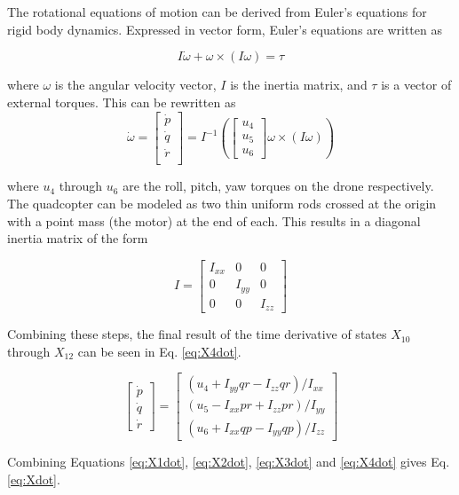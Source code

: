 \documentclass[letterpaper, preprint, paper,11pt]{AAS}	%
\begin{document}
The rotational equations of motion can be derived from Euler’s equations for rigid body dynamics. Expressed in vector form, Euler’s equations are written as

\[
I\dot{\omega}+\omega\times(I\omega)=\tau
\]

where $\omega$ is the angular velocity vector, $I$ is the inertia matrix, and $\tau$ is a vector of external torques. This can be rewritten as
\[
\dot{\omega}=\begin{bmatrix}
\dot{p}\\
\dot{q}\\
\dot{r}\\
\end{bmatrix}=
I^{-1}(\begin{bmatrix}
u_4\\u_5\\u_6
\end{bmatrix}\omega\times	(I\omega))
\]

where $u_4$ through $u_6$ are the roll, pitch, yaw torques on the drone respectively. The quadcopter can be modeled as two thin uniform rods crossed at the origin with a point mass (the motor) at the end of each. This results in a diagonal inertia matrix of the form

\[
I = \begin{bmatrix}
I_{xx}&0&0\\
0&I_{yy}&0\\
0&0&I_{zz}
\end{bmatrix}
\]

Combining these steps, the final result of the time derivative of states $X_{10}$ through $X_{12}$ can be seen in Eq. \eqref{eq:X4dot}\cite{X4dot}.

\begin{equation}
\label{eq:X4dot}
\begin{bmatrix}
\dot{p}\\
\dot{q}\\
\dot{r}
\end{bmatrix}=
\begin{bmatrix}
(u_4 + I_{yy}qr - I_{zz}qr)/I_{xx}\\
(u_5 - I_{xx}pr + I_{zz}pr)/I_{yy}\\
(u_6 + I_{xx}qp - I_{yy}qp)/I_{zz}
\end{bmatrix}
\end{equation}

Combining Equations \ref{eq:X1dot}, \ref{eq:X2dot}, \ref{eq:X3dot} and \ref{eq:X4dot} gives Eq. \eqref{eq:Xdot}.
\end{document}
